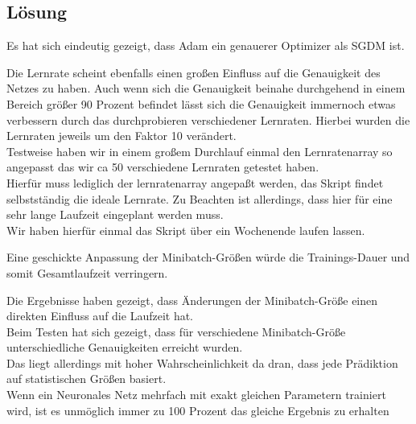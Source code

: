 \documentclass[8pt,a4paper]{article}
\begin{document}
\subsection{Lösung}
Es hat sich eindeutig gezeigt, dass Adam ein genauerer Optimizer als SGDM ist.

Die Lernrate scheint ebenfalls einen großen Einfluss auf die Genauigkeit des Netzes zu haben.
Auch wenn sich die Genauigkeit beinahe durchgehend in einem Bereich größer 90 Prozent befindet lässt sich die Genauigkeit immernoch etwas verbessern durch das durchprobieren verschiedener Lernraten.
Hierbei wurden die Lernraten jeweils um den Faktor 10 verändert.\\

Testweise haben wir in einem großem Durchlauf einmal den Lernratenarray so angepasst das wir ca 50 verschiedene Lernraten getestet haben.\\
Hierfür muss lediglich der lernratenarray angepaßt werden, das Skript findet selbstständig die ideale Lernrate.
Zu Beachten ist allerdings, dass hier für eine sehr lange Laufzeit eingeplant werden muss.\\

Wir haben hierfür einmal das Skript über ein Wochenende laufen lassen.

Eine geschickte Anpassung der Minibatch-Größen würde die Trainings-Dauer und somit Gesamtlaufzeit verringern.

Die Ergebnisse haben gezeigt, dass Änderungen der Minibatch-Größe einen direkten Einfluss auf die Laufzeit hat.\\
Beim Testen hat sich gezeigt, dass für verschiedene Minibatch-Größe unterschiedliche Genauigkeiten erreicht wurden.\\
Das liegt allerdings mit hoher Wahrscheinlichkeit da dran, dass jede Prädiktion auf statistischen Größen basiert.\\
Wenn ein Neuronales Netz mehrfach mit exakt gleichen Parametern trainiert wird, ist es  unmöglich immer zu 100 Prozent das gleiche Ergebnis zu erhalten
\end{document}
